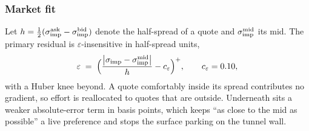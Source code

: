 %
%
%

\vspace{-0.4cm}

\subsubsection*{Market fit}

\vspace{-0.4cm}


Let $h=\tfrac12(\sigma_{\mathrm{imp}}^{\mathrm{ask}}-\sigma_{\mathrm{imp}}^{\mathrm{bid}})$ denote the half-spread of a quote and
$\sigma_{\mathrm{imp}}^{\mathrm{mid}}$ its mid. The primary residual is $\varepsilon$-insensitive in half-spread
units,
\begin{equation}\label{eq:fitresidual}
  \varepsilon\;=\;\Bigl(\frac{\bigl|\sigma_{\mathrm{imp}}-\sigma_{\mathrm{imp}}^{\mathrm{mid}}\bigr|}{h}-c_{\varepsilon}\Bigr)^{+},
  \qquad c_{\varepsilon}=0.10,
\end{equation}
with a Huber knee beyond. A quote comfortably inside its spread contributes no gradient, so effort is
reallocated to quotes that are outside.
Underneath sits a weaker absolute-error term in basis points, which keeps ``as close to the mid as
possible'' a live preference and stops the surface parking on the tunnel wall.

